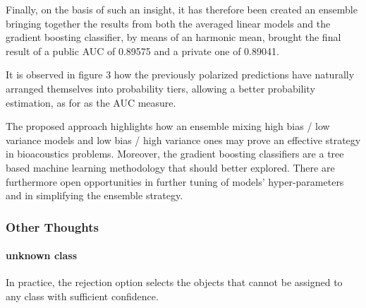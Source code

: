 Finally, on the basis of such an insight, it has therefore been created an ensemble bringing
together the results from both the averaged linear models and the gradient boosting
classifier, by means of an harmonic mean, brought the final result of a public AUC of
0.89575 and a private one of 0.89041.

It is observed in figure 3 how the previously polarized predictions have naturally arranged
themselves into probability tiers, allowing a better probability estimation, as for as the AUC
measure.

The proposed approach highlights how an ensemble mixing high bias / low variance models
and low bias / high variance ones may prove an effective strategy in bioacoustics problems.
Moreover, the gradient boosting classifiers are a tree based machine learning methodology
that should better explored. There are
furthermore open opportunities in further tuning of models’ hyper-parameters and in
simplifying the ensemble strategy.



\subsubsection{Other Thoughts}

\paragraph{unknown class}

In practice, the rejection option selects the objects that cannot be assigned to any class with sufficient confidence.

